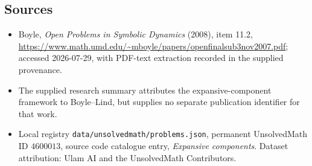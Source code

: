 \documentclass[11pt]{article}
\begin{document}
\subsection{Sources}
\begin{itemize}
\item Boyle, \emph{Open Problems in Symbolic Dynamics} (2008), item 11.2, \url{https://www.math.umd.edu/~mboyle/papers/openfinalsub3nov2007.pdf}; accessed 2026-07-29, with PDF-text extraction recorded in the supplied provenance.
\item The supplied research summary attributes the expansive-component framework to Boyle--Lind, but supplies no separate publication identifier for that work.
\item Local registry \texttt{data/unsolvedmath/problems.json}, permanent UnsolvedMath ID $4600013$, source code catalogue entry, \emph{Expansive components}. Dataset attribution: Ulam AI and the UnsolvedMath Contributors.
\end{itemize}
\end{document}
